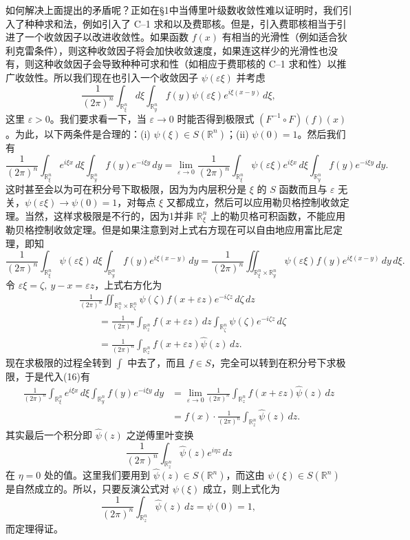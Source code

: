如何解决上面提出的矛盾呢？正如在§1中当傅里叶级数收敛性难以证明时，我们引入了种种求和法，例如引入了 C--1 求和以及费耶核。但是，引入费耶核相当于引进了一个收敛因子以改进收敛性。如果函数 $f(x)$ 有相当的光滑性（例如适合狄利克雷条件），则这种收敛因子将会加快收敛速度，如果连这样少的光滑性也没有，则这种收敛因子会导致种种可求和性（如相应于费耶核的 C--1 求和性）以推广收敛性。所以我们现在也引入一个收敛因子 $\psi(\varepsilon\xi)$ 并考虑
\[
 \frac1{(2\pi)^n}\int_{\mathbb R^n_\xi}d\xi\int_{\mathbb R^n_y}f(y)\psi(\varepsilon\xi)e^{i\xi(x-y)}\,d\xi,
\]
这里 $\varepsilon>0$。我们要求看一下，当 $\varepsilon\to0$ 时能否得到极限式 $(F^{-1}\circ F)(f)(x)$。为此，以下两条件是合理的：(i) $\psi(\xi)\in S(\mathbb R^n)$；(ii) $\psi(0)=1$。然后我们有
\begin{equation}
 \frac1{(2\pi)^n}\int_{\mathbb R^n_\xi}e^{i\xi x}\,d\xi
 \int_{\mathbb R^n_y}f(y)e^{-i\xi y}\,dy
 =\lim_{\varepsilon\to0}\frac1{(2\pi)^n}\int_{\mathbb R^n_\xi}\psi(\varepsilon\xi)e^{i\xi x}\,d\xi
 \int_{\mathbb R^n_y}f(y)e^{-i\xi y}\,dy.
 \tag{16}
\end{equation}
这时甚至会以为可在积分号下取极限，因为为内层积分是 $\xi$ 的 $S$ 函数而且与 $\varepsilon$ 无关，$\psi(\varepsilon\xi)\to\psi(0)=1$，对每点 $\xi$ 又都成立，然后可以应用勒贝格控制收敛定理。当然，这样求极限是不行的，因为1并非 $\mathbb R^n_\xi$ 上的勒贝格可积函数，不能应用勒贝格控制收敛定理。但是如果注意到对上式右方现在可以自由地应用富比尼定理，即知
\[
 \frac1{(2\pi)^n}\int_{\mathbb R^n_\xi}\psi(\varepsilon\xi)\,d\xi
 \int_{\mathbb R^n_y}f(y)e^{i\xi(x-y)}\,dy
 =\frac1{(2\pi)^n}\iint_{\mathbb R^n_\xi\times\mathbb R^n_y}
 \psi(\varepsilon\xi)f(y)e^{i\xi(x-y)}\,dy\,d\xi.
\]
令 $\varepsilon\xi=\zeta,\ y-x=\varepsilon z$，上式右方化为
\[
 \begin{aligned}
 &\frac1{(2\pi)^n}\iint_{\mathbb R^n_z\times\mathbb R^n_\zeta}
 \psi(\zeta)f(x+\varepsilon z)e^{-i\zeta z}\,d\zeta\,dz\\
 &\qquad=\frac1{(2\pi)^n}\int_{\mathbb R^n_z}f(x+\varepsilon z)\,dz
 \int_{\mathbb R^n_\zeta}\psi(\zeta)e^{-i\zeta z}\,d\zeta\\
 &\qquad=\frac1{(2\pi)^n}\int_{\mathbb R^n_z}f(x+\varepsilon z)\widehat\psi(z)\,dz.
 \end{aligned}
\]
现在求极限的过程全转到 $\int$ 中去了，而且 $f\in S$，完全可以转到在积分号下求极限，于是代入(16)有
\begin{equation}
 \begin{aligned}
 \frac1{(2\pi)^n}\int_{\mathbb R^n_\xi}e^{i\xi x}\,d\xi
 \int_{\mathbb R^n_y}f(y)e^{-i\xi y}\,dy
 &=\lim_{\varepsilon\to0}\frac1{(2\pi)^n}\int_{\mathbb R^n_z}f(x+\varepsilon z)\widehat\psi(z)\,dz\\
 &=f(x)\cdot\frac1{(2\pi)^n}\int_{\mathbb R^n_z}\widehat\psi(z)\,dz.
 \end{aligned}
 \tag{17}
\end{equation}
其实最后一个积分即 $\widehat\psi(z)$ 之逆傅里叶变换
\[
 \frac1{(2\pi)^n}\int_{\mathbb R^n_z}\widehat\psi(z)e^{i\eta z}\,dz
\]
在 $\eta=0$ 处的值。这里我们要用到 $\widehat\psi(z)\in S(\mathbb R^n)$，而这由 $\psi(\xi)\in S(\mathbb R^n)$ 是自然成立的。所以，只要反演公式对 $\psi(\xi)$ 成立，则上式化为
\[
 \frac1{(2\pi)^n}\int_{\mathbb R^n_z}\widehat\psi(z)\,dz=\psi(0)=1,
\]
而定理得证。

